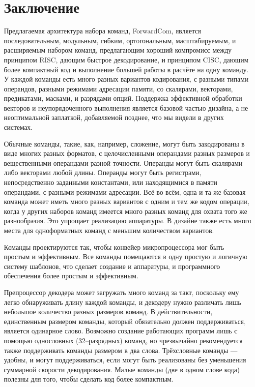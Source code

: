 \documentclass[forwardcom.tex]{subfiles}
\begin{document}
\chapter{Заключение}
Предлагаемая архитектура набора команд, ForwardCom, является последовательным, модульным, гибким, ортогональным, масштабируемым, и расширяемым набором команд, предлагающим хороший компромисс между принципом RISC, дающим быстрое декодирование, и принципом CISC, дающим более компактный код и выполнение большей работы в расчёте на одну команду. У каждой команды есть много разных вариантов кодирования, с разными типами операндов, разными режимами адресации памяти, со скалярами, векторами, предикатами, масками, и разрядами опций. Поддержка эффективной обработки векторов и неупорядоченного выполнения является базовой частью дизайна,  а не неоптимальной заплаткой, добавляемой позднее, что мы видели в других системах.

Обычные команды, такие, как, например, сложение, могут быть закодированы в виде многих разных форматов, с целочисленными операндами разных размеров и вещественными операндами разной точности. Операнды могут быть скалярами либо векторами любой длины. Операнды могут быть регистрами, непосредственно заданными константами, или находящимися в памяти операндами, с разными режимами адресации. Всё во всём, одна и та же базовая команда может иметь много разных вариантов с одним и тем же кодом операции, когда у других наборов команд имеется много разных команд для охвата того же разнообразия. Это упрощает реализацию аппаратуры. В дизайне также есть много места для одноформатных команд с меньшим количеством вариантов.

Команды проектируются так, чтобы конвейер микропроцессора мог быть простым и эффективным. Все команды помещаются в одну простую и логичную систему шаблонов, что сделает создание и аппаратуры, и программного обеспечения  более простым и эффективным.

Препроцессор декодера может загружать много команд за такт, поскольку ему легко обнаруживать длину каждой команды, и декодеру нужно различать лишь небольшое количество разных размеров команд. В действительности, единственным размером команды, который обязательно должен поддерживаться, является одинарное слово. Возможно создание работающих программ лишь с помощью однословных (32--разрядных) команд, но чрезвычайно рекомендуется также поддерживать команды размером в два слова. Трёхсловные команды --- удобны, и могут поддерживаться, если могут быть реализованы без уменьшения суммарной скорости декодирования. Малые команды  (две в одном слове кода) полезны для того, чтобы сделать код более компактным.
\end{document}
